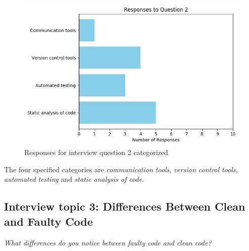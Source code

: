 \documentclass[../main.tex]{subfiles}
\begin{document}
\begin{figure}[H]
    \centering
    \includegraphics[scale=0.7]{images/Results/RQ2/RQ2_question_2.png}
    \caption{Responses for interview question 2 categorized}
    \label{fig:rq4Image2}
\end{figure}

The four specified categories are \textit{communication tools}, \textit{version control tools}, \textit{automated testing} and \textit{static analysis of code}. 

\subsection{Interview topic 3: Differences Between Clean and Faulty Code}

\textit{What differences do you notice between faulty code and clean code?}
\end{document}
